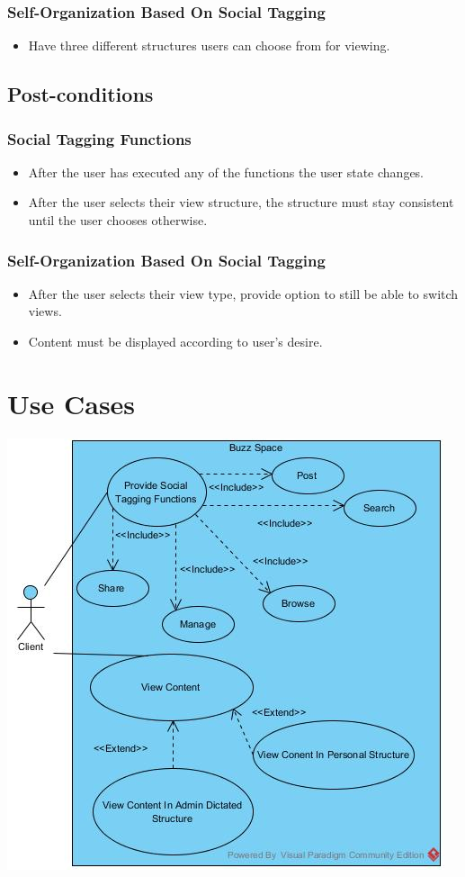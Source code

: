 \documentclass[12pt, oneside]{article}
\begin{document}
\subsubsection{Self-Organization Based On Social Tagging}
\begin{itemize}
\item Have three different structures users can choose from for viewing.
\end{itemize}

\subsection{Post-conditions}
\subsubsection{Social Tagging Functions}    
\begin{itemize}
\item After the user has executed any of the functions the user state changes.
\item After the user selects their view structure, the structure must stay consistent until the user chooses otherwise.
\end{itemize}
\subsubsection{Self-Organization Based On Social Tagging}
\begin{itemize}
\item After the user selects their view type, provide option to still be able to switch views.
\item Content must be displayed according to user's desire.
\end{itemize}
\section{Use Cases}
  \includegraphics{u29630135_socialTagging.jpg}
    \rule{0\linewidth}{0.15\linewidth}\par
\end{document}
